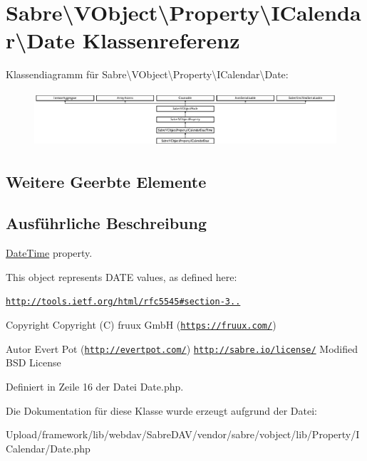 \hypertarget{class_sabre_1_1_v_object_1_1_property_1_1_i_calendar_1_1_date}{}\section{Sabre\textbackslash{}V\+Object\textbackslash{}Property\textbackslash{}I\+Calendar\textbackslash{}Date Klassenreferenz}
\label{class_sabre_1_1_v_object_1_1_property_1_1_i_calendar_1_1_date}
Klassendiagramm für Sabre\textbackslash{}V\+Object\textbackslash{}Property\textbackslash{}I\+Calendar\textbackslash{}Date\+:\begin{figure}[H]
\begin{center}
\leavevmode
\includegraphics[height=2.058824cm]{class_sabre_1_1_v_object_1_1_property_1_1_i_calendar_1_1_date}
\end{center}
\end{figure}
\subsection*{Weitere Geerbte Elemente}


\subsection{Ausführliche Beschreibung}
\mbox{\hyperlink{class_sabre_1_1_v_object_1_1_property_1_1_i_calendar_1_1_date_time}{Date\+Time}} property.

This object represents D\+A\+TE values, as defined here\+:

\href{http://tools.ietf.org/html/rfc5545#section-3.3.5}{\tt http\+://tools.\+ietf.\+org/html/rfc5545\#section-\/3..}

\begin{DoxyCopyright}{Copyright}
Copyright (C) fruux GmbH (\href{https://fruux.com/}{\tt https\+://fruux.\+com/}) 
\end{DoxyCopyright}
\begin{DoxyAuthor}{Autor}
Evert Pot (\href{http://evertpot.com/}{\tt http\+://evertpot.\+com/})  \href{http://sabre.io/license/}{\tt http\+://sabre.\+io/license/} Modified B\+SD License 
\end{DoxyAuthor}


Definiert in Zeile 16 der Datei Date.\+php.



Die Dokumentation für diese Klasse wurde erzeugt aufgrund der Datei\+:\begin{DoxyCompactItemize}
\item 
Upload/framework/lib/webdav/\+Sabre\+D\+A\+V/vendor/sabre/vobject/lib/\+Property/\+I\+Calendar/Date.\+php\end{DoxyCompactItemize}
